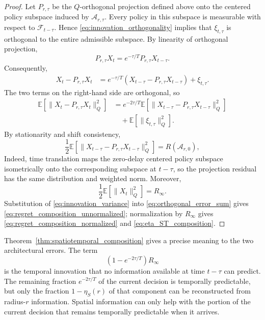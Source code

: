 \documentclass[11pt]{article}
\begin{document}
\begin{proof}
Let $P_{r,\tau}$ be the $Q$-orthogonal projection defined above onto the
centered policy subspace induced by $\mathcal{A}_{r,\tau}$. Every policy in this subspace is
measurable with respect to $\mathcal{F}_{t-\tau}$. Hence
\eqref{eq:innovation_orthogonality} implies that
$\xi_{t,\tau}$ is orthogonal to the entire admissible subspace. By linearity
of orthogonal projection,
\begin{equation}
    P_{r,\tau}X_t
    =
    e^{-\tau/T}
    P_{r,\tau}X_{t-\tau}.
    \label{eq:projection_of_innovation_decomposition}
\end{equation}
Consequently,
\begin{align}
    X_t-P_{r,\tau}X_t
    &=
    e^{-\tau/T}
    \left(
        X_{t-\tau}
        -
        P_{r,\tau}X_{t-\tau}
    \right)
    +
    \xi_{t,\tau}.
    \label{eq:projection_residual_decomposition}
\end{align}
The two terms on the right-hand side are orthogonal, so
\begin{align}
    \mathbb{E}
    \left[
        \|X_t-P_{r,\tau}X_t\|_Q^2
    \right]
    &=
    e^{-2\tau/T}
    \mathbb{E}
    \left[
        \|X_{t-\tau}
        -
        P_{r,\tau}X_{t-\tau}\|_Q^2
    \right]
    \nonumber\\
    &\quad+
    \mathbb{E}
    \left[
        \|\xi_{t,\tau}\|_Q^2
    \right].
    \label{eq:orthogonal_error_sum}
\end{align}
By stationarity and shift consistency,
\begin{equation}
    \frac{1}{2}
    \mathbb{E}
    \left[
        \|X_{t-\tau}
        -
        P_{r,\tau}X_{t-\tau}\|_Q^2
    \right]
    =
    R(\mathcal{A}_{r,0}),
    \label{eq:stationary_spatial_regret}
\end{equation}
Indeed, time translation maps the zero-delay centered policy subspace
isometrically onto the corresponding subspace at $t-\tau$, so the projection
residual has the same distribution and weighted norm.
Moreover,
\begin{equation}
    \frac{1}{2}
    \mathbb{E}
    \left[
        \|X_t\|_Q^2
    \right]
    =
    R_\infty.
    \label{eq:Rinf_centered_norm}
\end{equation}
Substitution of \eqref{eq:innovation_variance} into
\eqref{eq:orthogonal_error_sum} gives
\eqref{eq:regret_composition_unnormalized}; normalization by $R_\infty$
gives \eqref{eq:regret_composition_normalized} and
\eqref{eq:eta_ST_composition}.
\end{proof}

Theorem~\ref{thm:spatiotemporal_composition} gives a precise meaning to the
two architectural errors. The term
\[
    \left(
        1-e^{-2\tau/T}
    \right)R_\infty
\]
is the temporal innovation that no information available at time $t-\tau$
can predict. The remaining fraction $e^{-2\tau/T}$ of the current decision is
temporally predictable, but only the fraction $1-\eta_S(r)$ of that component
can be reconstructed from radius-$r$ information. Spatial information can only
help with the portion of the current decision that remains temporally
predictable when it arrives.
\end{document}
